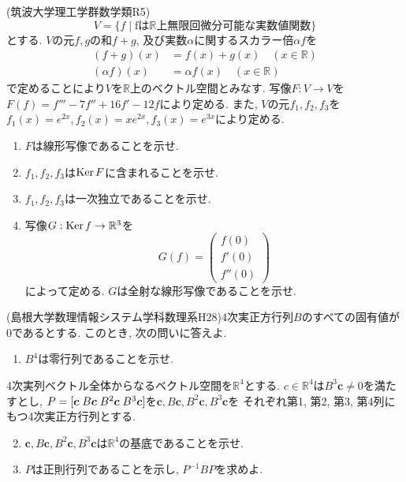 \documentclass[a4j,dvipdfmx]{jsarticle}
\newcommand{\R}{\mathbb{R}}
\newcommand{\Ker}{\mathrm{Ker}\hspace{0.5mm}}
\begin{document}
    \clearpage
    \begin{screen}
        (筑波大学理工学群数学類R5)
        \begin{equation*}
            V=\{f\mid\text{fは$\R$上無限回微分可能な実数値関数}\}
        \end{equation*}
        とする. $V$の元$f,g$の和$f+g$, 及び実数$\alpha$に関するスカラー倍$\alpha f$を
        \begin{align*}
            (f+g)(x)&=f(x)+g(x)\quad (x\in\R)\\
            (\alpha f)(x)&=\alpha f(x)\quad (x\in\R)
        \end{align*}
        で定めることにより$V$を$\R$上のベクトル空間とみなす. 写像$F:V\to V$を$F(f)=f'''-7f''+16f'-12f$により定める. また, $V$の元$f_1,f_2,f_3$を
        $f_1(x)=e^{2x},f_2(x)=xe^{2x},f_3(x)=e^{3x}$により定める.
        \begin{enumerate}
            \item $F$は線形写像であることを示せ.
            \item $f_1,f_2,f_3$は$\Ker F$に含まれることを示せ.
            \item $f_1,f_2,f_3$は一次独立であることを示せ.
            \item 写像$G:\Ker f\to \R^3$を
            \begin{equation*}
                G(f)=\begin{pmatrix}
                    f(0)\\f'(0)\\f''(0)
                \end{pmatrix}
            \end{equation*}
            によって定める. $G$は全射な線形写像であることを示せ.
        \end{enumerate}
    \end{screen}
    \clearpage
    \begin{screen}
        (島根大学数理情報システム学科数理系H28)4次実正方行列$B$のすべての固有値が0であるとする. このとき, 次の問いに答えよ.
        \begin{enumerate}
            \item $B^4$は零行列であることを示せ.
        \end{enumerate}
        4次実列ベクトル全体からなるベクトル空間を$\R^4$とする. $c\in\R^4$は$B^3\bm{c}\neq0$を満たすとし, $P=[\bm{c} \hspace{1mm} B\bm{c} \hspace{1mm} B^2\bm{c} \hspace{1mm} B^3\bm{c}]$を$\bm{c} , B\bm{c} ,B^2\bm{c} , B^3\bm{c}$を
        それぞれ第1, 第2, 第3, 第4列にもつ4次実正方行列とする.
        \begin{enumerate}\setcounter{enumi}{1}
            \item $\bm{c} , B\bm{c} ,B^2\bm{c} , B^3\bm{c}$は$\R^4$の基底であることを示せ.
            \item $P$は正則行列であることを示し, $P^{-1}BP$を求めよ.
        \end{enumerate}
    \end{screen}
\end{document}
